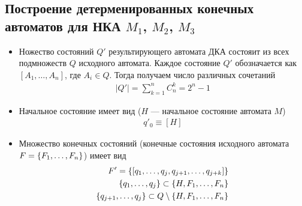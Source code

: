 \subsection{Построение детерменированных конечных автоматов для НКА \(M_1\), \(M_2\), \(M_3\)}

\begin{itemize}
	\item Ножество состояний \(Q'\) результирующего автомата ДКА состояит из всех подмножеств \(Q\) исходного автомата. Каждое состояние \(Q'\) обозначается как \([A_1,\dots,A_n]\), где \(A_i \in Q\). Тогда получаем число различных сочетаний
	      \begin{align*}
		      |Q'| = \sum_{k=1}^n C^k_n = 2^n - 1
	      \end{align*}
	\item Начальное состояние имеет вид (\(H\) --- начальное состояние автомата \(M\))
	      \begin{align*}
		      q'_0  \equiv [H]
	      \end{align*}
	\item Множество конечных состояний (конечные состояния исходного автомата \(F=\left\{F_1, \dots, F_n\right\}\)) имеет вид
	      \begin{align*}
		      F' = \left\{[q_1, \dots, q_j,q_{j+1},\dots,q_{j+k} ]\right\}    \\
		      \left\{q_1, \dots, q_j\right\} \subset \left\{H, F_1, \dots, F_n\right\} \\
		      \left\{q_{j+1},\dots,q_j\right\} \subset Q \setminus \left\{H, F_1, \dots, F_n\right\}
	      \end{align*}
\end{itemize}



